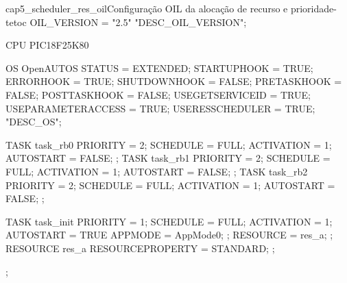 \begin{algoritmo}{cap5_scheduler_res_oil}{Configuração OIL da alocação de recurso e prioridade-teto}{c}
OIL_VERSION = "2.5" "DESC_OIL_VERSION";

CPU PIC18F25K80 {
	OS OpenAUTOS {
		STATUS = EXTENDED;
		STARTUPHOOK = TRUE;
		ERRORHOOK = TRUE;
		SHUTDOWNHOOK = FALSE;
		PRETASKHOOK = FALSE;
		POSTTASKHOOK = FALSE;
		USEGETSERVICEID = TRUE;
		USEPARAMETERACCESS = TRUE;
		USERESSCHEDULER = TRUE;
	} "DESC_OS";
	
	TASK task_rb0 {
		PRIORITY = 2;
		SCHEDULE = FULL;
		ACTIVATION = 1;
		AUTOSTART = FALSE;
	};
	TASK task_rb1 {
		PRIORITY = 2;
		SCHEDULE = FULL;
		ACTIVATION = 1;
		AUTOSTART = FALSE;
	};
	TASK task_rb2 {
		PRIORITY = 2;
		SCHEDULE = FULL;
		ACTIVATION = 1;
		AUTOSTART = FALSE;
	};
	
	TASK task_init {
		PRIORITY = 1;
		SCHEDULE = FULL;
		ACTIVATION = 1;
		AUTOSTART = TRUE {
			APPMODE = AppMode0;
		};
		RESOURCE = res_a;
	};
	RESOURCE res_a {
		RESOURCEPROPERTY = STANDARD;
	};
};
\end{algoritmo}